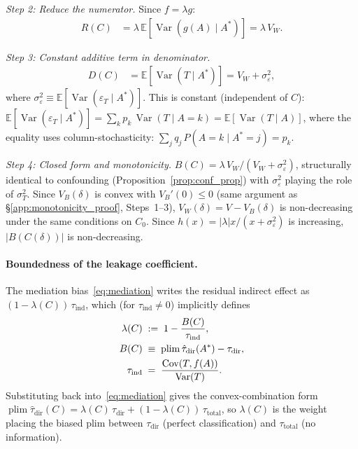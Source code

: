 \emph{Step 2: Reduce the numerator.}
Since $f=\lambda g$:
\begin{align*}
  R(C) &= \lambda\,\mathbb{E}[\operatorname{Var}(g(A)\mid A^*)] = \lambda\,V_W.
\end{align*}

\emph{Step 3: Constant additive term in denominator.}
\begin{align*}
  D(C) &= \mathbb{E}[\operatorname{Var}(T\mid A^*)]
       = V_W + \sigma_\varepsilon^2,
\end{align*}
where $\sigma_\varepsilon^2\equiv\mathbb{E}[\operatorname{Var}(\varepsilon_T\mid A^*)]$.
This is constant (independent of $C$):
$\mathbb{E}[\operatorname{Var}(\varepsilon_T\mid A^*)]
  = \sum_k p_k\,\operatorname{Var}(T\mid A{=}k)
  = \mathbb{E}[\operatorname{Var}(T\mid A)]$,
where the equality uses column-stochasticity: $\sum_j q_j\,P(A{=}k\mid A^*{=}j)=p_k$.

\emph{Step 4: Closed form and monotonicity.}
$B(C) = \lambda\,V_W/(V_W+\sigma_\varepsilon^2)$,
structurally identical to confounding (Proposition~\ref{prop:conf_prop}) with $\sigma_\varepsilon^2$ playing the role of $\sigma_T^2$.
Since $V_B(\delta)$ is convex with $V_B'(0)\leq 0$ (same argument as \S\ref{app:monotonicity_proof}, Steps~1--3), $V_W(\delta)=V{-}V_B(\delta)$ is non-decreasing under the same conditions on $C_0$.
Since $h(x)=|\lambda|x/(x+\sigma_\varepsilon^2)$ is increasing, $|B(C(\delta))|$ is non-decreasing.

\paragraph{Boundedness of the leakage coefficient.}

The mediation bias~\eqref{eq:mediation} writes the residual indirect effect as $(1-\lambda(C))\,\tau_{\mathrm{ind}}$, which (for $\tau_{\mathrm{ind}}\neq 0$) implicitly defines
\begin{align}
\label{eq:lambda_def}
  \lambda(C) &\;:=\; 1-\frac{B(C)}{\tau_{\mathrm{ind}}},\\
  B(C)&\;\equiv\;\operatorname{plim}\hat{\tau}_{\mathrm{dir}}(A^*)-\tau_{\mathrm{dir}},\notag\\
  \tau_{\mathrm{ind}}&\;=\;\frac{\operatorname{Cov}(T,f(A))}{\operatorname{Var}(T)}.\notag
\end{align}
Substituting back into~\eqref{eq:mediation} gives the convex-combination form
$\operatorname{plim}\hat\tau_{\mathrm{dir}}(C)=\lambda(C)\,\tau_{\mathrm{dir}}+(1-\lambda(C))\,\tau_{\mathrm{total}}$, so $\lambda(C)$ is the weight placing the biased plim between $\tau_{\mathrm{dir}}$ (perfect classification) and $\tau_{\mathrm{total}}$ (no information).


